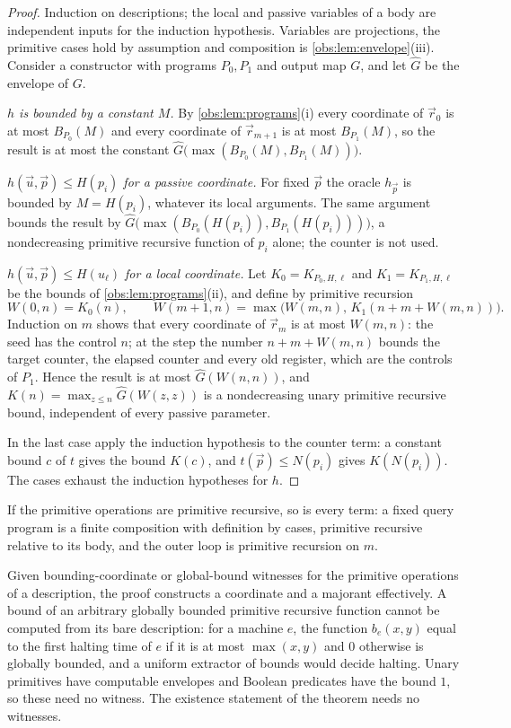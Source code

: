 \begin{proof}
Induction on descriptions; the local and passive variables of a body are
independent inputs for the induction hypothesis. Variables are projections, the
primitive cases hold by assumption and composition is
\cref{obs:lem:envelope}(iii). Consider a constructor with programs $P_0,P_1$ and
output map $G$, and let $\widehat G$ be the envelope of $G$.

\emph{$h$ is bounded by a constant $M$.} By \cref{obs:lem:programs}(i) every
coordinate of $\vec r_0$ is at most $B_{P_0}(M)$ and every coordinate of
$\vec r_{m+1}$ is at most $B_{P_1}(M)$, so the result is at most the constant
$\widehat G\bigl(\max(B_{P_0}(M),B_{P_1}(M))\bigr)$.

\emph{$h(\vec u,\vec p)\le H(p_i)$ for a passive coordinate.} For fixed
$\vec p$ the oracle $h_{\vec p}$ is bounded by $M=H(p_i)$, whatever its local
arguments. The same argument bounds the result by
$\widehat G\bigl(\max(B_{P_0}(H(p_i)),B_{P_1}(H(p_i)))\bigr)$, a nondecreasing
primitive recursive function of $p_i$ alone; the counter is not used.

\emph{$h(\vec u,\vec p)\le H(u_\ell)$ for a local coordinate.} Let
$K_0=K_{P_0,H,\ell}$ and $K_1=K_{P_1,H,\ell}$ be the bounds of
\cref{obs:lem:programs}(ii), and define by primitive recursion
\[
W(0,n)=K_0(n),\qquad
W(m+1,n)=\max\bigl(W(m,n),\,K_1(n+m+W(m,n))\bigr).
\]
Induction on $m$ shows that every coordinate of $\vec r_m$ is at most $W(m,n)$:
the seed has the control $n$; at the step the number $n+m+W(m,n)$ bounds the
target counter, the elapsed counter and every old register, which are the
controls of $P_1$. Hence the result is at most $\widehat G(W(n,n))$, and
$K(n)=\max_{z\le n}\widehat G(W(z,z))$ is a nondecreasing unary primitive
recursive bound, independent of every passive parameter.

In the last case apply the induction hypothesis to the counter term: a constant
bound $c$ of $t$ gives the bound $K(c)$, and $t(\vec p)\le N(p_i)$ gives
$K(N(p_i))$. The cases exhaust the induction hypotheses for $h$.
\end{proof}

If the primitive operations are primitive recursive, so is every term: a fixed
query program is a finite composition with definition by cases, primitive
recursive relative to its body, and the outer loop is primitive recursion on
$m$.

\begin{remark}[Effectiveness]
Given bounding-coordinate or global-bound witnesses for the primitive
operations of a description, the proof constructs a coordinate and a majorant
effectively. A bound of an arbitrary globally bounded primitive recursive
function cannot be computed from its bare description: for a machine $e$, the
function $b_e(x,y)$ equal to the first halting time of $e$ if it is at most
$\max(x,y)$ and $0$ otherwise is globally bounded, and a uniform extractor of
bounds would decide halting. Unary primitives have computable envelopes and
Boolean predicates have the bound $1$, so these need no witness. The existence
statement of the theorem needs no witnesses.
\end{remark}

